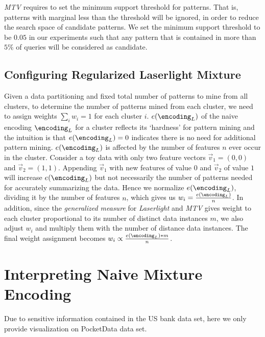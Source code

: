 \textit{MTV} requires to set the minimum support threshold for patterns. That is, patterns with marginal less than the threshold will be ignored, in order to reduce the search space of candidate patterns.
We set the minimum support threshold to be $0.05$ in our experiments such that any pattern that is contained in more than $5\%$ of queries will be considered as candidate.

\subsection{Configuring Regularized Laserlight Mixture}
\label{appendix:Configuring_Regularized Laserlight_Mixture}
Given a data partitioning and fixed total number of patterns to mine from all clusters, to determine the number of patterns mined from each cluster, we need to assign weights $\sum_i w_i=1$ for each cluster $i$. 
\errorname $e(\encoding_L)$ of the naive encoding $\encoding_L$ for a cluster reflects its `hardness' for pattern mining and the intuition is that $e(\encoding_L)=0$ indicates there is no need for additional pattern mining.
\errorname $e(\encoding_L)$ is affected by the number of features $n$ ever occur in the cluster.
Consider a toy data with only two feature vectors $\vec v_1=(0,0)$ and $\vec v_2=(1,1)$. Appending $\vec v_1$ with new features of value $0$ and $\vec v_2$ of value $1$ will increase $e(\encoding_L)$ but not necessarily the number of patterns needed for accurately summarizing the data.
Hence we normalize $e(\encoding_L)$, dividing it by the number of features $n$, which gives us $w_i=\frac{e(\encoding_L)}{n}$.
In addition, since the \textit{generalized measure} for \textit{Laserlight} and \textit{MTV} gives weight to each cluster proportional to its number of distinct data instances $m$, we also adjust $w_i$ and multiply them with the number of distance data instances.
The final weight assignment becomes $w_i \propto \frac{e(\encoding_L)*m}{n}$.

\section{Interpreting Naive Mixture Encoding}
\label{appendix:naivemixturesummaryvisualization}
Due to sensitive information contained in the US bank data set, here we only provide visualization on PocketData data set.

